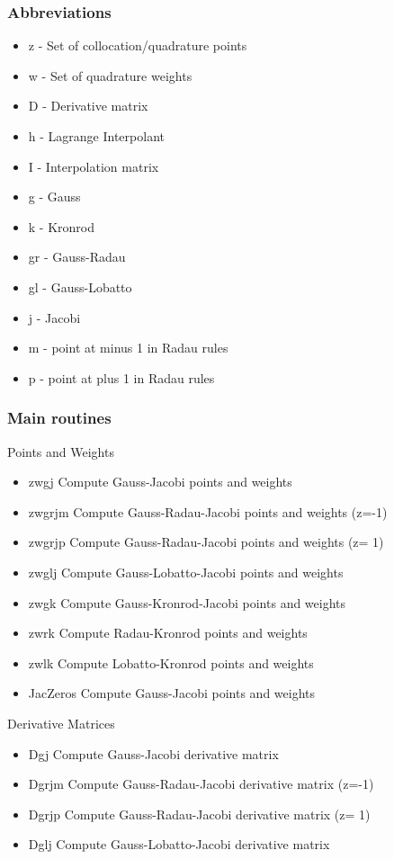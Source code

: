 \subsubsection{Abbreviations}
\begin{itemize}
\item z - Set of collocation/quadrature points
\item w - Set of quadrature weights
\item D - Derivative matrix
\item h - Lagrange Interpolant
\item I - Interpolation matrix
\item g - Gauss
\item k - Kronrod
\item gr - Gauss-Radau
\item gl - Gauss-Lobatto
\item j - Jacobi
\item m - point at minus 1 in Radau rules
\item p - point at plus 1 in Radau rules
\end{itemize}


\subsubsection{Main routines}

Points and Weights
\begin{itemize}
\item zwgj Compute Gauss-Jacobi points and weights
\item zwgrjm Compute Gauss-Radau-Jacobi points and weights (z=-1)
\item zwgrjp Compute Gauss-Radau-Jacobi points and weights (z= 1)
\item zwglj Compute Gauss-Lobatto-Jacobi points and weights
\item zwgk Compute Gauss-Kronrod-Jacobi points and weights
\item zwrk Compute Radau-Kronrod points and weights
\item zwlk Compute Lobatto-Kronrod points and weights
\item JacZeros Compute Gauss-Jacobi points and weights
\end{itemize}

Derivative Matrices
\begin{itemize}
\item Dgj Compute Gauss-Jacobi derivative matrix
\item Dgrjm Compute Gauss-Radau-Jacobi derivative matrix (z=-1)
\item Dgrjp Compute Gauss-Radau-Jacobi derivative matrix (z= 1)
\item Dglj Compute Gauss-Lobatto-Jacobi derivative matrix
\end{itemize}


